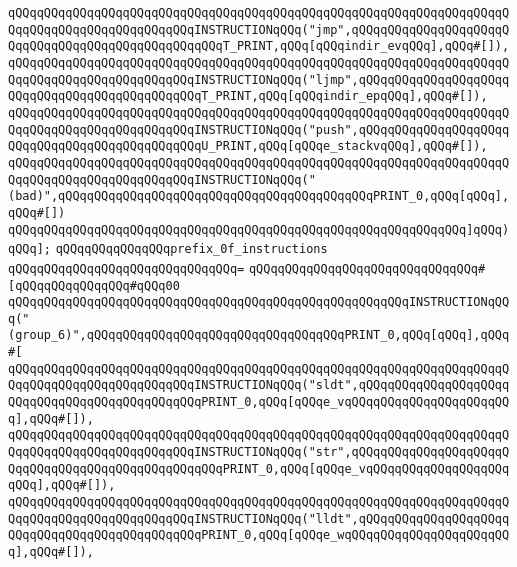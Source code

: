 \verb|qQQqqQQqqQQqqQQqqQQqqQQqqQQqqQQqqQQqqQQqqQQqqQQqqQQqqQQqqQQqqQQqqQQqqQQqqQQqqQQqqQQqqQQqqQQqqQQqINSTRUCTIONqQQq("jmp",qQQqqQQqqQQqqQQqqQQqqQQqqQQqqQQqqQQqqQQqqQQqqQQqqQQqT_PRINT,qQQq[qQQqindir_evqQQq],qQQq#[]),|\newline
\verb|qQQqqQQqqQQqqQQqqQQqqQQqqQQqqQQqqQQqqQQqqQQqqQQqqQQqqQQqqQQqqQQqqQQqqQQqqQQqqQQqqQQqqQQqqQQqqQQqINSTRUCTIONqQQq("ljmp",qQQqqQQqqQQqqQQqqQQqqQQqqQQqqQQqqQQqqQQqqQQqqQQqT_PRINT,qQQq[qQQqindir_epqQQq],qQQq#[]),|\newline
\verb|qQQqqQQqqQQqqQQqqQQqqQQqqQQqqQQqqQQqqQQqqQQqqQQqqQQqqQQqqQQqqQQqqQQqqQQqqQQqqQQqqQQqqQQqqQQqqQQqINSTRUCTIONqQQq("push",qQQqqQQqqQQqqQQqqQQqqQQqqQQqqQQqqQQqqQQqqQQqqQQqU_PRINT,qQQq[qQQqe_stackvqQQq],qQQq#[]),|\newline
\verb|qQQqqQQqqQQqqQQqqQQqqQQqqQQqqQQqqQQqqQQqqQQqqQQqqQQqqQQqqQQqqQQqqQQqqQQqqQQqqQQqqQQqqQQqqQQqqQQqINSTRUCTIONqQQq("(bad)",qQQqqQQqqQQqqQQqqQQqqQQqqQQqqQQqqQQqqQQqqQQqPRINT_0,qQQq[qQQq],qQQq#[])|\newline
\verb|qQQqqQQqqQQqqQQqqQQqqQQqqQQqqQQqqQQqqQQqqQQqqQQqqQQqqQQqqQQqqQQq]qQQq)|\newline
\newline
\verb|qQQq];|\newline
\verb|qQQqqQQqqQQqqQQqprefix_0f_instructions|\newline
\verb|qQQqqQQqqQQqqQQqqQQqqQQqqQQqqQQq=|\newline
\verb|qQQqqQQqqQQqqQQqqQQqqQQqqQQqqQQq#[qQQqqQQqqQQqqQQq#qQQq00|\newline
\verb|qQQqqQQqqQQqqQQqqQQqqQQqqQQqqQQqqQQqqQQqqQQqqQQqqQQqqQQqINSTRUCTIONqQQq("(group_6)",qQQqqQQqqQQqqQQqqQQqqQQqqQQqqQQqqQQqPRINT_0,qQQq[qQQq],qQQq#[|\newline
\verb|qQQqqQQqqQQqqQQqqQQqqQQqqQQqqQQqqQQqqQQqqQQqqQQqqQQqqQQqqQQqqQQqqQQqqQQqqQQqqQQqqQQqqQQqqQQqqQQqINSTRUCTIONqQQq("sldt",qQQqqQQqqQQqqQQqqQQqqQQqqQQqqQQqqQQqqQQqqQQqqQQqPRINT_0,qQQq[qQQqe_vqQQqqQQqqQQqqQQqqQQqqQQq],qQQq#[]),|\newline
\verb|qQQqqQQqqQQqqQQqqQQqqQQqqQQqqQQqqQQqqQQqqQQqqQQqqQQqqQQqqQQqqQQqqQQqqQQqqQQqqQQqqQQqqQQqqQQqqQQqINSTRUCTIONqQQq("str",qQQqqQQqqQQqqQQqqQQqqQQqqQQqqQQqqQQqqQQqqQQqqQQqqQQqPRINT_0,qQQq[qQQqe_vqQQqqQQqqQQqqQQqqQQqqQQq],qQQq#[]),|\newline
\verb|qQQqqQQqqQQqqQQqqQQqqQQqqQQqqQQqqQQqqQQqqQQqqQQqqQQqqQQqqQQqqQQqqQQqqQQqqQQqqQQqqQQqqQQqqQQqqQQqINSTRUCTIONqQQq("lldt",qQQqqQQqqQQqqQQqqQQqqQQqqQQqqQQqqQQqqQQqqQQqqQQqPRINT_0,qQQq[qQQqe_wqQQqqQQqqQQqqQQqqQQqqQQq],qQQq#[]),|\newline
